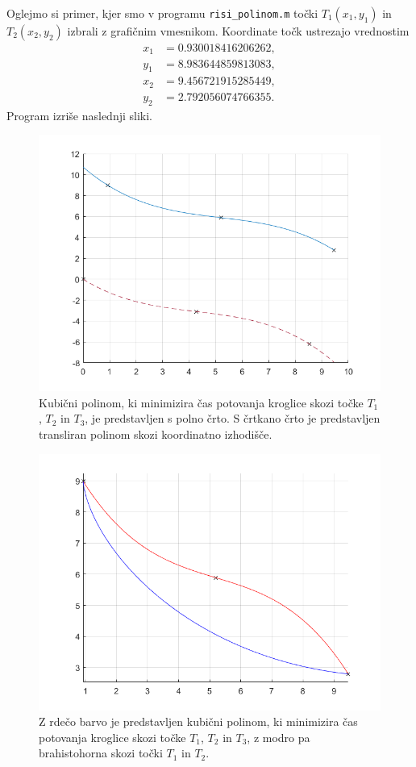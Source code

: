 \documentclass[a4paper]{article}
\begin{document}
Oglejmo si primer, kjer smo v programu \texttt{risi\_polinom.m} točki $T_1(x_1,y_1)$ in $T_2(x_2,y_2)$ izbrali z grafičnim vmesnikom. Koordinate točk ustrezajo vrednostim
\begin{align*}
x_1 &= 0.930018416206262, \\
y_1 &= 8.983644859813083, \\
x_2 &= 9.456721915285449, \\
y_2 &= 2.792056074766355.
\end{align*}
%
Program izriše naslednji sliki.

\begin{figure}[h!]
\includegraphics[scale=0.6]{primer1-polinom.png}
\caption{Kubični polinom, ki minimizira čas potovanja kroglice skozi točke $T_1$, $T_2$ in $T_3$, je predstavljen s polno črto. S črtkano črto je predstavljen transliran polinom skozi koordinatno izhodišče.}
\end{figure}

\begin{figure}[h!]
\includegraphics[scale=0.6]{primer1-PolBrah.png}
\caption{Z rdečo barvo je predstavljen kubični polinom, ki minimizira čas potovanja kroglice skozi točke $T_1$, $T_2$ in $T_3$, z modro pa brahistohorna skozi točki $T_1$ in $T_2$.}
\end{figure}
\end{document}

